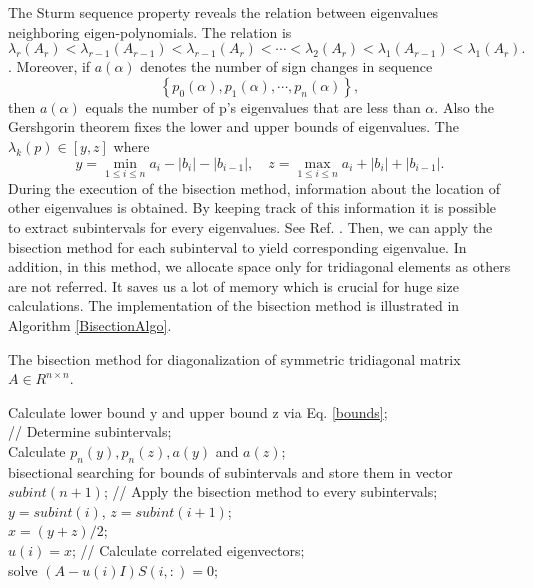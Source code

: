 The Sturm sequence property \cite{golub2012matrix} reveals the relation between eigenvalues neighboring eigen-polynomials. 
	The relation is 
\begin{equation}
	\lambda_r(A_r)<\lambda_{r-1}(A
	_{r-1})<\lambda_{r-1}(A
	_{r})<\cdots<\lambda_2(A
	_{r})<\lambda_{1}(A_
	{r-1})<\lambda_{1}(A_{r}).
\end{equation}.
Moreover, if $a(\alpha)$ denotes the number of sign changes in sequence
\[
	\left\{p_0(\alpha),p_1(\alpha),\cdots,p_n(\alpha)\right\},
\]
then $a(\alpha)$ equals the number of p's eigenvalues that are less than $\alpha$. 
Also the Gershgorin theorem fixes the lower and upper bounds of eigenvalues. 
The $\lambda_k(p)\in[y,z]$ where
\begin{equation}\label{bounds}
	y = \min_{1\le i \le n}a_i - |b_i| -|b_{i-1}|,\quad z = \max_{1\le i \le n}a_i + |b_i| + |b_{i-1}|.
\end{equation}
During the execution of the bisection method, information about the location of other eigenvalues is obtained.
By keeping track of this information it is possible to extract subintervals for every eigenvalues. 
See Ref. \cite{wilkinson1962calculation}.
Then, we can apply the bisection method for each subinterval to yield corresponding eigenvalue. 
In addition, in this method, we allocate space only for tridiagonal elements as others are not referred. 
It saves us a lot of memory which is crucial for huge size  calculations.
The implementation of the bisection method is illustrated in Algorithm \ref{BisectionAlgo}.
\begin{algorithm}[tb]
	\label{BisectionAlgo}
	\caption{The bisection method for diagonalization of symmetric tridiagonal matrix $A\in R^{n\times n}$. }
	Calculate lower bound y and upper bound z
	via Eq. \ref{bounds};\\
	// Determine subintervals;\\
	Calculate $p_n(y), p_n(z), a(y)$ and $a(z)$;\\
    {
		bisectional searching for bounds of subintervals and store them in vector $subint(n+1)$;
    }
    // Apply the bisection method to every subintervals;\\ 
	{
	$y = subint(i)$, $z = subint(i+1)$;\\
    {
		$x=(y+z)/2$;\\
    }
    $u(i) = x$;
    }
    // Calculate correlated eigenvectors;\\
    {
    solve $(A-u(i)I)S(i,:) = 0;$
    }
\end{algorithm}
